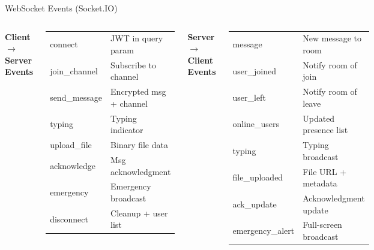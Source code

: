 \documentclass[aspectratio=169,12pt]{beamer}
\begin{document}
\begin{frame}{WebSocket Events (Socket.IO)}
\begin{columns}[t]
\small\bfseries Client $\to$ Server Events
\vspace{4pt}
\begin{tcolorbox}[colback=SlideGray,colframe=BPDark,arc=4pt,
  left=4pt,right=4pt,top=4pt,bottom=4pt]
\ttfamily\scriptsize
\begin{tabular}{@{}p{}p{}@{}}
  \textcolor{AccentBlue}{connect}       & JWT in query param \\[2pt]
  \textcolor{AccentBlue}{join\_channel} & Subscribe to channel \\[2pt]
  \textcolor{AccentBlue}{send\_message} & Encrypted msg + channel \\[2pt]
  \textcolor{AccentBlue}{typing}        & Typing indicator \\[2pt]
  \textcolor{AccentBlue}{upload\_file}  & Binary file data \\[2pt]
  \textcolor{AccentBlue}{acknowledge}   & Msg acknowledgment \\[2pt]
  \textcolor{AccentBlue}{emergency}     & Emergency broadcast \\[2pt]
  \textcolor{AccentBlue}{disconnect}    & Cleanup + user list \\
\end{tabular}
\end{tcolorbox}

\small\bfseries Server $\to$ Client Events
\vspace{4pt}
\begin{tcolorbox}[colback=SlideGray,colframe=BPGreen,arc=4pt,
  left=4pt,right=4pt,top=4pt,bottom=4pt]
\ttfamily\scriptsize
\begin{tabular}{@{}p{}p{}@{}}
  \textcolor{BPGreen}{message}         & New message to room \\[2pt]
  \textcolor{BPGreen}{user\_joined}    & Notify room of join \\[2pt]
  \textcolor{BPGreen}{user\_left}      & Notify room of leave \\[2pt]
  \textcolor{BPGreen}{online\_users}   & Updated presence list \\[2pt]
  \textcolor{BPGreen}{typing}          & Typing broadcast \\[2pt]
  \textcolor{BPGreen}{file\_uploaded}  & File URL + metadata \\[2pt]
  \textcolor{BPGreen}{ack\_update}     & Acknowledgment update \\[2pt]
  \textcolor{BPGreen}{emergency\_alert}& Full-screen broadcast \\
\end{tabular}
\end{tcolorbox}
\end{columns}


\end{frame}
\end{document}
